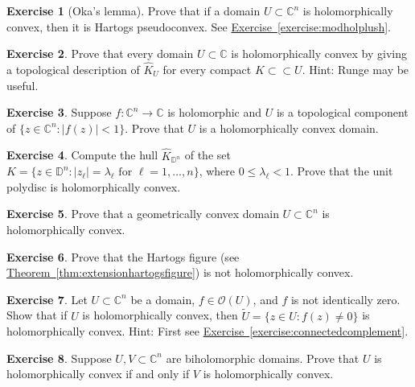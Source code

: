 \documentclass[12pt,openany]{book}
\newcommand{\sabs}[1]{\lvert {#1} \rvert}
\newcommand{\C}{{\mathbb{C}}}
\newcommand{\D}{{\mathbb{D}}}
\newcommand{\sO}{{\mathscr{O}}}
\theoremstyle{plain}
\theoremstyle{remark}
\theoremstyle{definition}
\newenvironment{exbox}{%
    \def\FrameCommand{\vrule width 1pt \relax\hspace{10pt}}%
    \MakeFramed{\advance\hsize-\width\FrameRestore}%
}{%
    \endMakeFramed
}
\theoremstyle{exercise}
\newtheorem{exercise}{Exercise}[section]
\theoremstyle{example}
\newcommand{\exerciseref}[1]{\hyperref[#1]{Exercise~\ref*{#1}}}
\newcommand{\thmref}[1]{\hyperref[#1]{Theorem~\ref*{#1}}}
\begin{document}
\begin{exbox}
\begin{exercise}[Oka's lemma]
Prove that if a domain $U \subset \C^n$ is holomorphically convex,
then it is Hartogs pseudoconvex.
See \exerciseref{exercise:modholplush}.
\end{exercise}

\begin{exercise}
Prove that every domain $U \subset \C$ is holomorphically convex by
giving a topological description of $\widehat{K}_U$ for every
compact $K \subset \subset U$.  Hint: Runge may be useful.
\end{exercise}

\begin{exercise}
Suppose $f \colon \C^n \to \C$ is holomorphic and $U$ is a topological
component of $\bigl\{ z \in \C^n : \sabs{f(z)} < 1 \bigr\}$.  Prove
that $U$ is a holomorphically convex domain.
\end{exercise}

\begin{exercise}
Compute the hull
$\widehat{K}_{\D^n}$ of the set $K = \bigl\{ z \in \D^n : \sabs{z_\ell} =
\lambda_\ell \text{ for } \ell=1,\ldots,n \bigr\}$, where $0 \leq \lambda_\ell < 1$.
Prove that the unit polydisc is holomorphically convex.
\end{exercise}

\begin{exercise}
Prove that a geometrically convex domain $U \subset \C^n$
is holomorphically convex.
\end{exercise}

\begin{exercise}
Prove that the Hartogs figure (see \thmref{thm:extensionhartogsfigure})
is not holomorphically convex.
\end{exercise}

\begin{exercise}
Let $U \subset \C^n$ be a domain, $f \in \sO(U)$, and $f$ is not identically
zero.  Show that if
$U$ is holomorphically convex, then
$\widetilde{U} = \bigl\{ z \in U : f(z) \neq 0 \bigr\}$
is holomorphically convex.
Hint: First see \exerciseref{exercise:connectedcomplement}.
\end{exercise}

\begin{exercise} \label{exercise:biholholconvex}
Suppose $U,V \subset \C^n$ are biholomorphic domains.
Prove that $U$ is holomorphically convex if and only if $V$ is
holomorphically convex.
\end{exercise}


\end{exbox}
\end{document}
